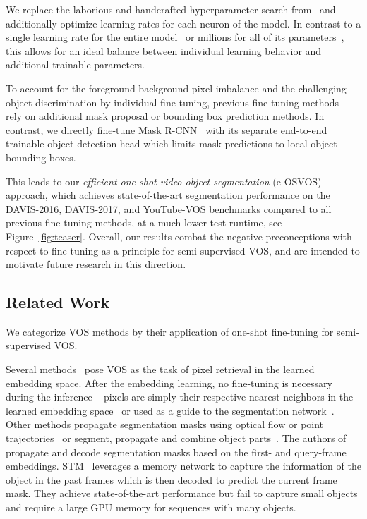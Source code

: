 \documentclass{article}
\begin{document}
We replace the laborious and handcrafted hyperparameter search from~\cite{OSVOS,OSVOS-S,premvos,onavos} and additionally optimize learning rates for each neuron of the model.
In contrast to a single learning rate for the entire model~\cite{how_train_maml} or millions for all of its parameters~\cite{MVOS}, this allows for an ideal balance between individual learning behavior and additional trainable parameters.

To account for the foreground-background pixel imbalance and the challenging object discrimination by individual fine-tuning, previous fine-tuning methods~\cite{OSVOS-S,premvos,onavos} rely on additional mask proposal or bounding box prediction methods.
In contrast, we directly fine-tune Mask R-CNN~\cite{MaskRCNN} with its separate end-to-end trainable object detection head which limits mask predictions to local object bounding boxes.





    This leads to our {\it efficient one-shot video object segmentation} (e-OSVOS) approach, which achieves state-of-the-art segmentation performance on the DAVIS-2016, DAVIS-2017, and YouTube-VOS benchmarks compared to all previous fine-tuning methods, at a much lower test runtime, see Figure~\ref{fig:teaser}.
Overall, our results combat the negative preconceptions with respect to fine-tuning as a principle for semi-supervised VOS, and are intended to motivate future research in this direction.




\subsection{Related Work}
We categorize VOS methods by their application of one-shot fine-tuning for semi-supervised VOS.

Several methods~\cite{BlazinglyFV, VideoMatch,voigtlaender2019feelvos} pose VOS as the task of pixel retrieval in the learned embedding space.
After the embedding learning, no fine-tuning is necessary during the inference -- pixels are simply their respective nearest neighbors in the learned embedding space~\cite{BlazinglyFV, VideoMatch} or used as a guide to the segmentation network~\cite{voigtlaender2019feelvos}.
Other methods propagate segmentation masks using optical flow or point trajectories~\cite{Cheng_ICCV_2017, 8325298, RANet} or segment, propagate and combine object parts~\cite{Cheng_favos_2018}.
The authors of~\cite{oh2018fast} propagate and decode segmentation masks based on the first- and query-frame embeddings.
STM~\cite{STM_19} leverages a memory network to capture the information of the object in the past frames which is then decoded to predict the current frame mask.
They achieve state-of-the-art performance but fail to capture small objects and require a large GPU memory for sequences with many objects.
\end{document}
